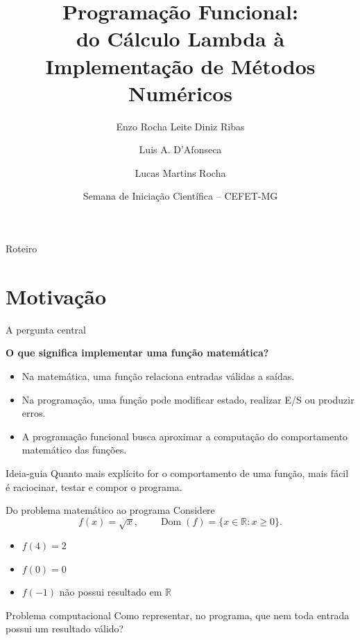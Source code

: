 \documentclass[aspectratio=169,11pt]{beamer}
\title[Programação Funcional]{Programação Funcional:\\do Cálculo Lambda à Implementação de Métodos Numéricos}
\author[Ribas et al.]{Enzo Rocha Leite Diniz Ribas \and Luis A. D'Afonseca \and Lucas Martins Rocha}
\institute[CEFET-MG]{Centro Federal de Educação Tecnológica de Minas Gerais\\Belo Horizonte -- MG}
\date{Semana de Iniciação Científica -- CEFET-MG}
\begin{document}
\begin{frame}\titlepage\end{frame}

\begin{frame}{Roteiro}
    \tableofcontents
\end{frame}

\section{Motivação}

\begin{frame}{A pergunta central}
    \begin{center}\Large\textbf{O que significa implementar uma função matemática?}\end{center}
    \vspace{0.4cm}
    \begin{itemize}
        \item Na matemática, uma função relaciona entradas válidas a saídas.
        \item Na programação, uma função pode modificar estado, realizar E/S ou produzir
              erros.
        \item A programação funcional busca aproximar a computação do comportamento
              matemático das funções.
    \end{itemize}
    \begin{block}{Ideia-guia}
        Quanto mais explícito for o comportamento de uma função, mais fácil é raciocinar, testar e compor o programa.
    \end{block}
\end{frame}

\begin{frame}{Do problema matemático ao programa}
    Considere
    \[
        f(x)=\sqrt{x},\qquad \operatorname{Dom}(f)=\{x\in\mathbb{R}:x\geq0\}.
    \]
    \begin{itemize}
        \item $f(4)=2$
        \item $f(0)=0$
        \item $f(-1)$ não possui resultado em $\mathbb{R}$
    \end{itemize}
    \begin{alertblock}{Problema computacional}
        Como representar, no programa, que nem toda entrada possui um resultado válido?
    \end{alertblock}
\end{frame}
\end{document}
